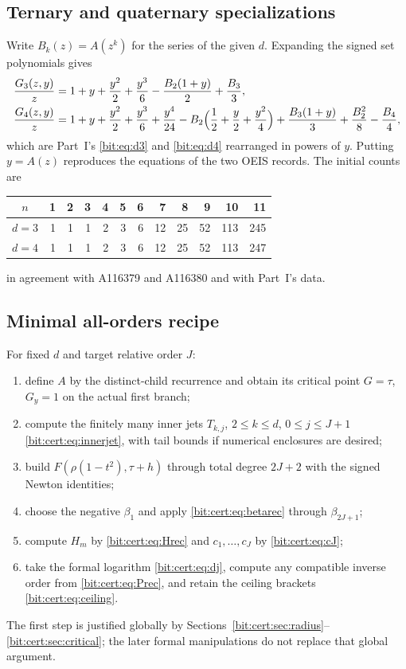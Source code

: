 \documentclass[11pt]{article}
\theoremstyle{definition}\newtheorem{definition}[theorem]{Definition}
\theoremstyle{remark}\newtheorem{remark}[theorem]{Remark}
\begin{document}
\subsection{Ternary and quaternary specializations}\label{bit:cert:sec:special}
Write $B_k(z)=A(z^k)$ for the series of the given $d$. Expanding the signed set
polynomials gives
\begin{align}
 \frac{G_3(z,y)}z
 &=1+y+\frac{y^2}2+\frac{y^3}6
       -\frac{B_2(1+y)}2+\frac{B_3}3,\label{bit:cert:eq:G3}\\
 \frac{G_4(z,y)}z
 &=1+y+\frac{y^2}2+\frac{y^3}6+\frac{y^4}{24}
       -B_2\Bigl(\frac12+\frac y2+\frac{y^2}4\Bigr)
       +\frac{B_3(1+y)}3+\frac{B_2^2}8-\frac{B_4}4,\label{bit:cert:eq:G4}
\end{align}
which are Part~I's \eqref{bit:eq:d3} and \eqref{bit:eq:d4} rearranged in
powers of $y$. Putting $y=A(z)$ reproduces the equations of the two OEIS
records. The initial counts are
\begin{center}
\begin{tabular}{c|rrrrrrrrrrr}\toprule
$n$&1&2&3&4&5&6&7&8&9&10&11\\\midrule
$d=3$&1&1&1&2&3&6&12&25&52&113&245\\
$d=4$&1&1&1&2&3&6&12&25&52&113&247\\\bottomrule
\end{tabular}
\end{center}
in agreement with A116379 and A116380 \cite{oeis3,oeis4} and with Part~I's data.

\subsection{Minimal all-orders recipe}\label{bit:cert:sec:recipe}
For fixed $d$ and target relative order $J$:
\begin{enumerate}
\item define $A$ by the distinct-child recurrence and obtain its critical
 point $G=\tau$, $G_y=1$ on the actual first branch;
\item compute the finitely many inner jets $T_{k,j}$, $2\le k\le d$,
 $0\le j\le J+1$ \eqref{bit:cert:eq:innerjet}, with tail bounds if numerical
 enclosures are desired;
\item build $F(\rho(1-t^2),\tau+h)$ through total degree $2J+2$ with the signed
 Newton identities;
\item choose the negative $\beta_1$ and apply \eqref{bit:cert:eq:betarec}
 through $\beta_{2J+1}$;
\item compute $H_m$ by \eqref{bit:cert:eq:Hrec} and $c_1,\ldots,c_J$ by
 \eqref{bit:cert:eq:cJ};
\item take the formal logarithm \eqref{bit:cert:eq:dj}, compute any compatible
 inverse order from \eqref{bit:cert:eq:Prec}, and retain the ceiling brackets
 \eqref{bit:cert:eq:ceiling}.
\end{enumerate}
The first step is justified globally by
Sections~\ref{bit:cert:sec:radius}--\ref{bit:cert:sec:critical}; the later
formal manipulations do not replace that global argument.
\end{document}
